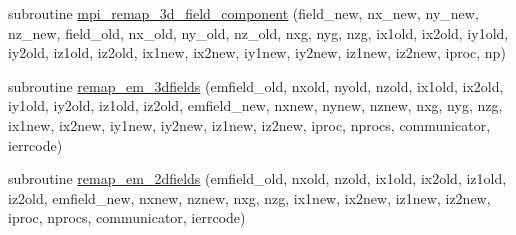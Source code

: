\begin{DoxyCompactItemize}
\item 
subroutine \hyperlink{namespaceload__balance_a39e48009fed76be1c45b695d0c18579f}{mpi\+\_\+remap\+\_\+3d\+\_\+field\+\_\+component} (field\+\_\+new, nx\+\_\+new, ny\+\_\+new, nz\+\_\+new,                                                                                                                                                                                                                           field\+\_\+old, nx\+\_\+old, ny\+\_\+old, nz\+\_\+old,                                                                                                                                                                                                                           nxg, nyg, nzg,                                                                                                                                                                                                                                                                                                       ix1old, ix2old, iy1old, iy2old, iz1old, iz2old,                                                                                                                                                           ix1new, ix2new, iy1new, iy2new, iz1new, iz2new,                                                                                                                                                           iproc, np)
\item 
subroutine \hyperlink{namespaceload__balance_a87910b5d990f9577ace6192cae34adee}{remap\+\_\+em\+\_\+3dfields} (emfield\+\_\+old, nxold, nyold, nzold,                                                                                                                                                               ix1old, ix2old, iy1old, iy2old, iz1old, iz2old,                                                                                                                       emfield\+\_\+new, nxnew, nynew, nznew, nxg, nyg, nzg,                                                                                                                       ix1new, ix2new, iy1new, iy2new, iz1new, iz2new,                                                                                                                       iproc, nprocs, communicator, ierrcode)
\item 
subroutine \hyperlink{namespaceload__balance_a63d87c1dde6113bc22318b1869514c59}{remap\+\_\+em\+\_\+2dfields} (emfield\+\_\+old, nxold, nzold,                                                                                                                                                               ix1old, ix2old, iz1old, iz2old,                                                                                                                                                       emfield\+\_\+new, nxnew, nznew, nxg, nzg,                                                                                                                                       ix1new, ix2new, iz1new, iz2new,                                                                                                                                                       iproc, nprocs, communicator, ierrcode)

\end{DoxyCompactItemize}
